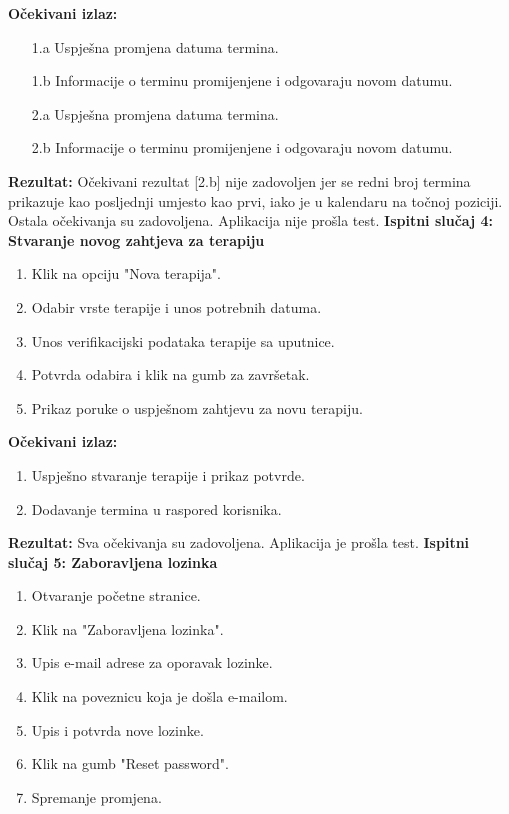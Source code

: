 			\textbf{Očekivani izlaz:}
			\begin{enumerate}
				\item[1.a] Uspješna promjena datuma termina.
				\item[1.b] Informacije o terminu promijenjene i odgovaraju novom datumu.
				\item[2.a] Uspješna promjena datuma termina.
				\item[2.b] Informacije o terminu promijenjene i odgovaraju novom datumu.
			\end{enumerate}
			\textbf{Rezultat:} Očekivani rezultat [2.b] nije zadovoljen jer se redni broj termina prikazuje kao posljednji umjesto kao prvi, iako je u kalendaru na točnoj poziciji. Ostala očekivanja su zadovoljena. \color{red} Aplikacija nije prošla test. \color{black} \newline
			\textbf{Ispitni slučaj 4: Stvaranje novog zahtjeva za terapiju}
			\begin{enumerate}
				\item Klik na opciju "Nova terapija".
				\item Odabir vrste terapije i unos potrebnih datuma.
				\item Unos verifikacijski podataka terapije sa uputnice.
				\item Potvrda odabira i klik na gumb za završetak.
				\item Prikaz poruke o uspješnom zahtjevu za novu terapiju.
			\end{enumerate}
			\textbf{Očekivani izlaz:}
			\begin{enumerate}
				\item Uspješno stvaranje terapije i prikaz potvrde. 
				\item Dodavanje termina u raspored korisnika.
			\end{enumerate}
			\textbf{Rezultat:} Sva očekivanja su zadovoljena. \color{green} Aplikacija je prošla test. \color{black} \newline
			\textbf{Ispitni slučaj 5: Zaboravljena lozinka}
			\begin{enumerate}
				\item Otvaranje početne stranice.
				\item Klik na "Zaboravljena lozinka".
				\item Upis e-mail adrese za oporavak lozinke.
				\item Klik na poveznicu koja je došla e-mailom.
				\item Upis i potvrda nove lozinke.
				\item Klik na gumb "Reset password".
				\item Spremanje promjena.
			\end{enumerate}
